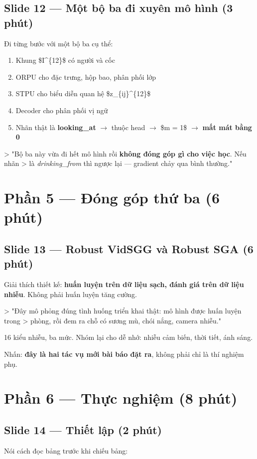 \documentclass[11pt,a4paper]{article}
\begin{document}
\subsection{Slide 12 --- Một bộ ba đi xuyên mô hình (3 phút)}
Đi từng bước với một bộ ba cụ thể:

\begin{enumerate}\itemsep2pt
\item Khung \$I\textasciicircum{}\{12\}\$ có người và cốc
\item ORPU cho đặc trưng, hộp bao, phân phối lớp
\item STPU cho biểu diễn quan hệ \$z\_\{ij\}\textasciicircum{}\{12\}\$
\item Decoder cho phân phối vị ngữ
\item Nhãn thật là \textbf{looking\_at} $\rightarrow$ thuộc head $\rightarrow$ \$m = 1\$ $\rightarrow$ \textbf{mất mát bằng 0}
\end{enumerate}
> "Bộ ba này vừa đi hết mô hình rồi \textbf{không đóng góp gì cho việc học}. Nếu nhãn > là \emph{drinking\_from} thì ngược lại --- gradient chảy qua bình thường."

\section{Phần 5 --- Đóng góp thứ ba (6 phút)}
\subsection{Slide 13 --- Robust VidSGG và Robust SGA (6 phút)}
Giải thích thiết kế: \textbf{huấn luyện trên dữ liệu sạch, đánh giá trên dữ liệu nhiễu}. Không phải huấn luyện tăng cường.

> "Đây mô phỏng đúng tình huống triển khai thật: mô hình được huấn luyện trong > phòng, rồi đem ra chỗ có sương mù, chói nắng, camera nhiễu."

16 kiểu nhiễu, ba mức. Nhóm lại cho dễ nhớ: nhiễu cảm biến, thời tiết, ánh sáng.

Nhấn: \textbf{đây là hai tác vụ mới bài báo đặt ra}, không phải chỉ là thí nghiệm phụ.

\section{Phần 6 --- Thực nghiệm (8 phút)}
\subsection{Slide 14 --- Thiết lập (2 phút)}
Nói cách đọc bảng trước khi chiếu bảng:
\end{document}
